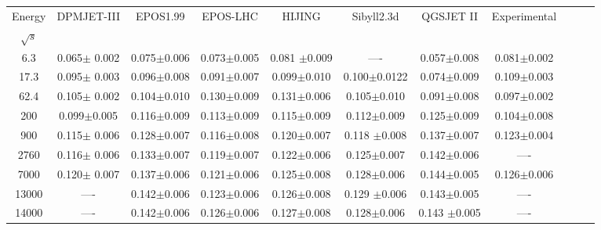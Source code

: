 \begin{table*}[!htb]
{\begin{center}
\begin{tabular}{ccccccccccc}
 \small Energy& \small DPMJET-III&\small EPOS1.99 &\small EPOS-LHC  &\small HIJING &\small Sibyll2.3d&\small QGSJET II &\small Experimental \\
 $\sqrt{s}$  &      &   &    &   & & \\
\hline
    \small 6.3  &\small 0.065$\pm$ 0.002 &\small 0.075$\pm$0.006 &\small 0.073$\pm$0.005 &\small 0.081 $\pm$0.009 &\small ---- & \small 0.057$\pm$0.008&\small 0.081$\pm$0.002\\
    \small 17.3 & \small  0.095$\pm$ 0.003  & \small 0.096$\pm$0.008 &\small 0.091$\pm$0.007 & \small 0.099$\pm$0.010 & \small0.100$\pm$0.0122 &\small 0.074$\pm$0.009 &\small 0.109$\pm$0.003\\
    \small 62.4 &\small 0.105$\pm$  0.002 &\small 0.104$\pm$0.010 &\small 0.130$\pm$0.009 &\small 0.131$\pm$0.006 &\small 0.105$\pm$0.010 &\small 0.091$\pm$0.008 &\small 0.097$\pm$0.002\\
    \small 200 &\small 0.099$\pm$0.005 &\small 0.116$\pm$0.009 &\small 0.113$\pm$0.009 &\small  0.115$\pm$0.009&\small 0.112$\pm$0.009 &\small 0.125$\pm$0.009 &\small 0.104$\pm$0.008\\
    \small 900 &\small  0.115$\pm$ 0.006 &\small 0.128$\pm$0.007 &\small 0.116$\pm$0.008 &\small 0.120$\pm$0.007 &\small 0.118 $\pm$0.008 &\small 0.137$\pm$0.007 &\small 0.123$\pm$0.004 \\
    \small 2760 &\small 0.116$\pm$  0.006 &\small 0.133$\pm$0.007 &\small 0.119$\pm$0.007 &\small 0.122$\pm$0.006 &\small 0.125$\pm$0.007 &\small 0.142$\pm$0.006 &\small ----\\
    \small 7000 &\small  0.120$\pm$ 0.007 &\small 0.137$\pm$0.006 &\small 0.121$\pm$0.006 &\small 0.125$\pm$0.008 &\small 0.128$\pm$0.006 &\small 0.144$\pm$0.005&\small  0.126$\pm$0.006\\
    \small 13000  &\small ---- &\small 0.142$\pm$0.006 &\small 0.123$\pm$0.006 &\small 0.126$\pm$0.008 &\small 0.129  $\pm$0.006 &\small 0.143$\pm$0.005& \small----\\
    \small 14000  &\small---- &\small 0.142$\pm$0.006 &\small 0.126$\pm$0.006 &\small 0.127$\pm$0.008 &\small  0.128$\pm$0.006 &\small 0.143   $\pm$0.005 &\small ----\\
\hline
\end{tabular}%
\end{center}}
\end{table*}

%
